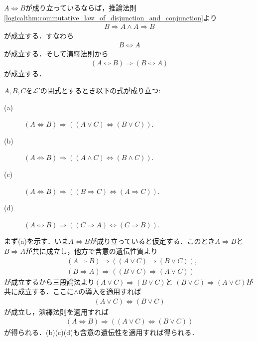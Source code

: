 	\begin{sketch}
		$A \Longleftrightarrow B$が成り立っているならば，推論法則\ref{logicalthm:commutative_law_of_disjunction_and_conjunction}より
		\begin{align}
			B \Longrightarrow A \wedge A \Longrightarrow B
		\end{align}
		が成立する．すなわち
		\begin{align}
			B \Longleftrightarrow A
		\end{align}
		が成立する．そして演繹法則から
		\begin{align}
			(A \Longleftrightarrow B) \Longrightarrow (B \Longleftrightarrow A)
		\end{align}
		が成立する．
		\QED
	\end{sketch}
	
	\begin{screen}
		\begin{logicalthm}[同値記号の遺伝性質]\label{logicalthm:hereditary_of_equivalence}
			$A,B,C$を$\mathcal{L}'$の閉式とするとき以下の式が成り立つ:
			\begin{description}
				\item[(a)] $(A \Longleftrightarrow B) \Longrightarrow ((A \vee C) \Longleftrightarrow (B \vee C))$.
				\item[(b)] $(A \Longleftrightarrow B) \Longrightarrow ((A \wedge C) \Longleftrightarrow (B \wedge C))$.
				\item[(c)] $(A \Longleftrightarrow B) \Longrightarrow ((B \Longrightarrow C) \Longleftrightarrow (A \Longrightarrow C))$.
				
				\item[(d)] $(A \Longleftrightarrow B) \Longrightarrow ((C \Longrightarrow A) \Longleftrightarrow (C \Longrightarrow B))$.
			\end{description}
		\end{logicalthm}
	\end{screen}
	
	\begin{prf}
		まず(a)を示す．いま$A \Longleftrightarrow B$が成り立っていると仮定する．このとき$A \Longrightarrow B$と
		$B \Longrightarrow A$が共に成立し，他方で含意の遺伝性質より
		\begin{align}
			&(A \Longrightarrow B) \Longrightarrow ((A \vee C) \Longrightarrow (B \vee C)), \\
			&(B \Longrightarrow A) \Longrightarrow ((B \vee C) \Longrightarrow (A \vee C))
		\end{align}
		が成立するから三段論法より$(A \vee C) \Longrightarrow (B \vee C)$と
		$(B \vee C) \Longrightarrow (A \vee C)$が共に成立する．ここに$\wedge$の導入を適用すれば
		\begin{align}
			(A \vee C) \Longleftrightarrow (B \vee C)
		\end{align}
		が成立し，演繹法則を適用すれば
		\begin{align}
			(A \Longleftrightarrow B) \Longrightarrow ((A \vee C) \Longleftrightarrow (B \vee C))
		\end{align}
		が得られる．(b)(c)(d)も含意の遺伝性を適用すれば得られる．
		\QED
	\end{prf}
	
